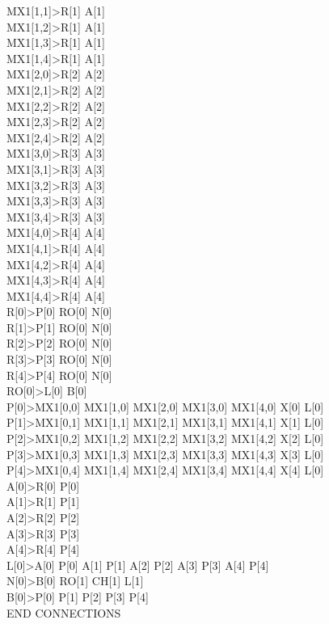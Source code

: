 \documentclass[12pt,a4paper]{article}
\begin{document}
MX1[1,1]>R[1] A[1]\\
MX1[1,2]>R[1] A[1]\\
MX1[1,3]>R[1] A[1]\\
MX1[1,4]>R[1] A[1]\\
MX1[2,0]>R[2] A[2]\\
MX1[2,1]>R[2] A[2]\\
MX1[2,2]>R[2] A[2]\\
MX1[2,3]>R[2] A[2]\\
MX1[2,4]>R[2] A[2]\\
MX1[3,0]>R[3] A[3]\\
MX1[3,1]>R[3] A[3]\\
MX1[3,2]>R[3] A[3]\\
MX1[3,3]>R[3] A[3]\\
MX1[3,4]>R[3] A[3]\\
MX1[4,0]>R[4] A[4]\\
MX1[4,1]>R[4] A[4]\\
MX1[4,2]>R[4] A[4]\\
MX1[4,3]>R[4] A[4]\\
MX1[4,4]>R[4] A[4]\\
R[0]>P[0] RO[0] N[0]\\
R[1]>P[1] RO[0] N[0]\\
R[2]>P[2] RO[0] N[0]\\
R[3]>P[3] RO[0] N[0]\\
R[4]>P[4] RO[0] N[0]\\
RO[0]>L[0] B[0]\\
P[0]>MX1[0,0] MX1[1,0] MX1[2,0] MX1[3,0] MX1[4,0] X[0] L[0]\\
P[1]>MX1[0,1] MX1[1,1] MX1[2,1] MX1[3,1] MX1[4,1] X[1] L[0]\\
P[2]>MX1[0,2] MX1[1,2] MX1[2,2] MX1[3,2] MX1[4,2] X[2] L[0]\\
P[3]>MX1[0,3] MX1[1,3] MX1[2,3] MX1[3,3] MX1[4,3] X[3] L[0]\\
P[4]>MX1[0,4] MX1[1,4] MX1[2,4] MX1[3,4] MX1[4,4] X[4] L[0]\\
A[0]>R[0] P[0]\\
A[1]>R[1] P[1]\\
A[2]>R[2] P[2]\\
A[3]>R[3] P[3]\\
A[4]>R[4] P[4]\\
L[0]>A[0] P[0] A[1] P[1] A[2] P[2] A[3] P[3] A[4] P[4]\\
N[0]>B[0] RO[1] CH[1] L[1]\\
B[0]>P[0] P[1] P[2] P[3] P[4]\\
END CONNECTIONS\\
\end{document}
